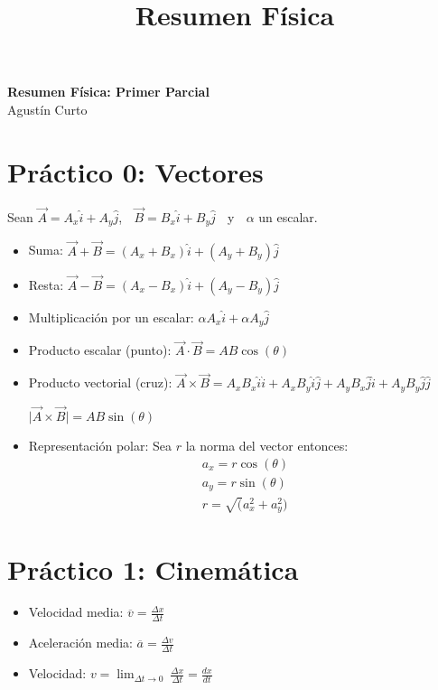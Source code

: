 \documentclass[11pt,a4paper]{article}
\title{Resumen Física}
\providecommand{\abs}[1]{\lvert#1\rvert}
\newcommand{\PN}{\par\noindent}
\begin{document}
	\begin{center}
		\Huge \textbf{Resumen Física: Primer Parcial} \\
		\large Agustín Curto
	\end{center}

	\section*{Práctico 0: Vectores}
		\PN Sean $\vec{A} = A_{x} \hat{i} + A_{y} \hat{j}$, $\;$ $\vec{B} = B_{x} \hat{i} + B_{y} \hat{j}$ $\;$ y $\;$
			$\alpha$ un escalar.
		\begin{multicols}{2}
			\begin{itemize}
				\item Suma: $\vec{A} + \vec{B} = (A_{x} + B_{x}) \hat{i} + (A_{y} + B_{y}) \hat{j}$
				\item Resta: $\vec{A} - \vec{B} = (A_{x} - B_{x}) \hat{i} + (A_{y} - B_{y}) \hat{j}$
				\item Multiplicación por un escalar: $\alpha A_{x} \hat{i} + \alpha A_{y} \hat{j}$
				\item Producto escalar (punto): $\vec{A} \cdot \vec{B} = AB \cos(\theta)$
				\item Producto vectorial (cruz): $\vec{A} \times \vec{B} = A_{x} B_{x} \hat{i}\hat{i} + A_{x} B_{y}
					\hat{i}\hat{j} + A_{y} B_{x} \hat{j}\hat{i} + A_{y} B_{y} \hat{j}\hat{j}$
					\PN $\abs{\vec{A} \times \vec{B}} = AB \sin(\theta)$
				\item Representación polar: Sea $r$ la norma del vector entonces:
					\begin{eqnarray*}
						a_{x} = r \cos(\theta) \\
						a_{y} = r \sin(\theta) \\
						r = \sqrt(a_{x}^{2} + a_{y}^{2})
					\end{eqnarray*}
			\end{itemize}
		\end{multicols}

	\section*{Práctico 1: Cinemática}
		\begin{itemize}
			\item Velocidad media: $\overline{v} = \frac{\Delta x}{\Delta t}$
			\item Aceleración media: $\overline{a} = \frac{\Delta v}{\Delta t}$
			\item Velocidad: $v = \lim_{\Delta t \rightarrow 0} \ \frac{\Delta x}{\Delta t} = \frac{dx}{dt}$
		\end{itemize}
\end{document}
